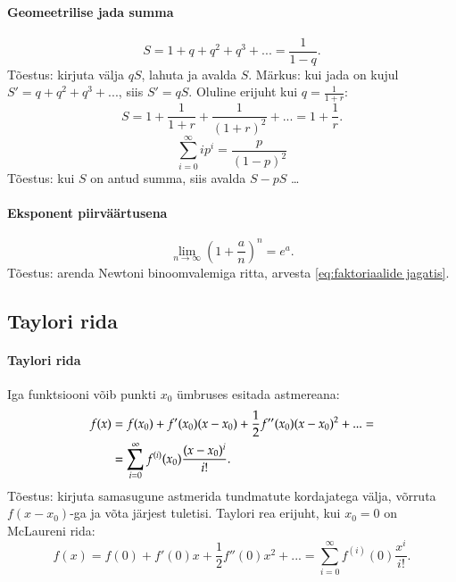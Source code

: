 \documentclass[a4paper]{article}
\numberwithin{equation}{subsection}
\begin{document}
\paragraph{Geomeetrilise jada summa}
\begin{equation}
S=1+q+q^2+q^3+... = \frac{1 }{ 1-q}.
\end{equation}
Tõestus: kirjuta välja $qS$, lahuta ja avalda $S$. Märkus: kui jada on
kujul $S'=q+q^2+q^3+...$, siis $S'=qS$. Oluline erijuht kui $q=\frac{1 }{
1+r}$:
\begin{equation}
 S = 1 + \frac{1 }{ 1+r} + \frac{1 }{ (1+r)^2} + ... = 1 + \frac{1 }{ r}.
\end{equation}
\begin{equation}
  \sum_{i=0}^\infty i p^i = \frac{p}{(1 - p)^2}
\end{equation}
Tõestus: kui $S$ on antud summa, siis avalda $S - pS$ \ldots

\paragraph{Eksponent piirväärtusena}
\begin{equation}
 \lim_{n\to\infty} \left( 1 + \frac{a}{ n} \right)^n = e^a.
\end{equation}
Tõestus: arenda Newtoni binoomvalemiga ritta, arvesta
\eqref{eq:faktoriaalide jagatis}.


\subsection{Taylori rida}

\paragraph{Taylori rida}
Iga funktsiooni võib punkti $x_0$ ümbruses esitada astmereana:
\begin{align}
f(x) & =f(x_0) + f'(x_0)(x-x_0) + \frac{1}{ 2}f''(x_0)(x-x_0)^2 +
  ... = \notag\\
  & =\sum^\infty_{i=0} f^{(i)}(x_0) \frac{(x-x_0)^i }{ i!}.
\end{align}
Tõestus: kirjuta samasugune
astmerida tundmatute kordajatega välja, võrruta $f(x-x_0)$-ga ja võta
järjest tuletisi. Taylori rea erijuht, kui $x_0=0$ on McLaureni rida:
\begin{equation}
f(x) =f(0) + f'(0)x + \frac{1}{ 2} f''(0)x^2 + ...
  = \sum^\infty_{i=0} f^{(i)}(0) \frac{x^i }{ i!}.
\end{equation}
\end{document}
